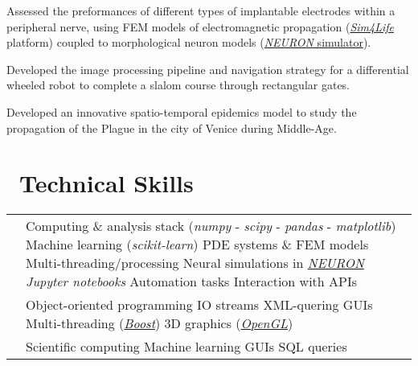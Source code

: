 \documentclass[a4paper]{cv}
\begin{document}
\begin{minipage}[t]{0.6\textwidth}
Assessed the preformances of different types of implantable electrodes within a peripheral nerve, using FEM models of electromagnetic propagation (\href{http://www.zurichmedtech.com/sim4life/}{\emph{Sim4Life}} platform) coupled to morphological neuron models (\href{https://neuron.yale.edu/neuron/}{\emph{NEURON} simulator}).
\sectionspace

Developed the image processing pipeline and navigation strategy for a differential wheeled robot to complete a slalom course through rectangular gates.
\sectionspace

Developed an innovative spatio-temporal epidemics model to study the propagation of the Plague in the city of Venice during Middle-Age.
\sectionspace

\section{\texorpdfstring{\faWrench}\ \ Technical Skills}\sectionline

\def\arraystretch{1.5}
\begin{tabular}{R{0.21\textwidth} L{0.7\textwidth}}

 & Computing \& analysis stack (\emph{numpy} - \emph{scipy} - \emph{pandas} - \emph{matplotlib}) \tbl{} Machine learning (\emph{scikit-learn}) \tbl{} PDE systems \& FEM models \tbl{} Multi-threading/processing \tbl{} Neural simulations in \href{https://neuron.yale.edu/neuron/}{\emph{NEURON}} \tbl{} \emph{Jupyter notebooks} \tbl{} Automation tasks \tbl{}Interaction with APIs\\

 & Object-oriented programming \tbl{} IO streams \tbl{} XML-quering \tbl{} GUIs \tbl{} Multi-threading (\href{https://www.boost.org/}{\emph{Boost}}) \tbl{} 3D graphics (\href{https://www.opengl.org/}{\emph{OpenGL}})\\

 & Scientific computing \tbl{} Machine learning \tbl{} GUIs \tbl{} SQL queries\\


\end{tabular}
\end{minipage}
\end{document}
